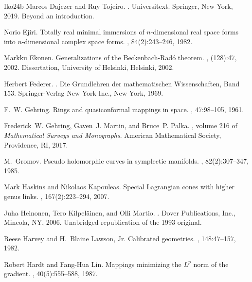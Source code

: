 \documentclass[a4paper,leqno,11pt]{amsart}
\numberwithin{equation}{section}
\theoremstyle{remark}
\theoremstyle{remark}
\begin{document}
\begin{thebibliography}{{Iko}24b}
Marcos Dajczer and Ruy Tojeiro.
.
\newblock Universitext. Springer, New York, 2019.
\newblock Beyond an introduction.

Norio Ejiri.
\newblock Totally real minimal immersions of {$n$}-dimensional real space forms into {$n$}-dimensional complex space forms.
, 84(2):243--246, 1982.

Markku Ekonen.
\newblock Generalizations of the {B}eckenbach-{R}ad\'o{} theorem.
, (128):47, 2002.
\newblock Dissertation, University of Helsinki, Helsinki, 2002.

Herbert Federer.
.
\newblock Die Grundlehren der mathematischen Wissenschaften, Band 153. Springer-Verlag New York Inc., New York, 1969.

F.~W. Gehring.
\newblock Rings and quasiconformal mappings in space.
, 47:98--105, 1961.

Frederick~W. Gehring, Gaven~J. Martin, and Bruce~P. Palka.
, volume 216 of {\em Mathematical Surveys and Monographs}.
\newblock American Mathematical Society, Providence, RI, 2017.

M.~Gromov.
\newblock Pseudo holomorphic curves in symplectic manifolds.
, 82(2):307--347, 1985.

Mark Haskins and Nikolaos Kapouleas.
\newblock Special {L}agrangian cones with higher genus links.
, 167(2):223--294, 2007.

Juha Heinonen, Tero Kilpel\"ainen, and Olli Martio.
.
\newblock Dover Publications, Inc., Mineola, NY, 2006.
\newblock Unabridged republication of the 1993 original.

Reese Harvey and H.~Blaine Lawson, Jr.
\newblock Calibrated geometries.
, 148:47--157, 1982.

Robert Hardt and Fang-Hua Lin.
\newblock Mappings minimizing the {$L^p$} norm of the gradient.
, 40(5):555--588, 1987.


\end{thebibliography}
\end{document}
